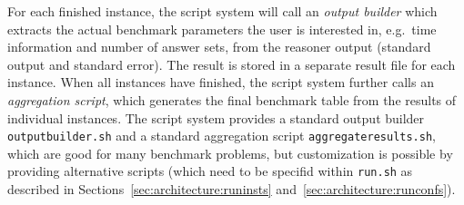 \documentclass[a4paper]{article}
\begin{document}
		For each finished instance, the script system will call an \emph{output builder}
		which extracts the actual benchmark parameters the user is interested in,
		e.g.~time information and number of answer sets,
		from the reasoner output (standard output and standard error).
		The result is stored in a separate result file for each instance.
		When all instances have finished, the script system further calls an \emph{aggregation script},
		which generates the final benchmark table from the results of individual instances.
		The script system provides a standard output builder {\tt outputbuilder.sh} and a standard aggregation script {\tt aggregateresults.sh},
		which are good for many benchmark problems, but customization is possible by providing alternative scripts
		(which need to be specifid within {\tt run.sh} as described in Sections~\ref{sec:architecture:runinsts} and~\ref{sec:architecture:runconfs}).
\end{document}
